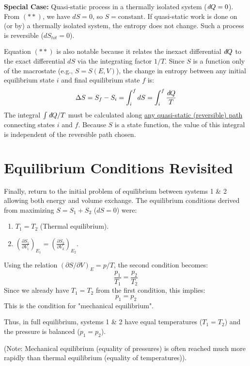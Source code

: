 \documentclass[11pt]{article}
\newcommand{\pderiv}[2]{\frac{\partial #1}{\partial #2}}
\newcommand{\ethbar}{\text{\it{đ}}} %
\begin{document}
\textbf{Special Case:} Quasi-static process in a thermally isolated system ($\ethbar Q = 0$).
From $(**)$, we have $dS = 0$, so $S = \text{constant}$.
If quasi-static work is done on (or by) a thermally isolated system, the entropy does not change. Such a process is reversible ($dS_{tot}=0$).

Equation $(**)$ is also notable because it relates the inexact differential $\ethbar Q$ to the exact differential $dS$ via the integrating factor $1/T$.
Since $S$ is a function only of the macrostate (e.g., $S=S(E,V)$), the change in entropy between any initial equilibrium state $i$ and final equilibrium state $f$ is:
\[ \Delta S = S_f - S_i = \int_i^f dS = \int_i^f \frac{\ethbar Q}{T} \]
The integral $\int \ethbar Q / T$ must be calculated along \underline{any quasi-static (reversible) path} connecting states $i$ and $f$. Because $S$ is a state function, the value of this integral is independent of the reversible path chosen.

\begin{center}
\end{center}

\section*{Equilibrium Conditions Revisited}

Finally, return to the initial problem of equilibrium between systems 1 \& 2 allowing both energy and volume exchange.
The equilibrium conditions derived from maximizing $S=S_1+S_2$ ($dS=0$) were:
\begin{enumerate}
    \item $T_1 = T_2$ (Thermal equilibrium).
    \item $\left( \pderiv{S_1}{V_1} \right)_{E_1} = \left( \pderiv{S_2}{V_2} \right)_{E_2}$.
\end{enumerate}
Using the relation $(\partial S / \partial V)_E = p/T$, the second condition becomes:
\[ \frac{p_1}{T_1} = \frac{p_2}{T_2} \]
Since we already have $T_1 = T_2$ from the first condition, this implies:
\[ p_1 = p_2 \]
This is the condition for "mechanical equilibrium".

Thus, in full equilibrium, systems 1 \& 2 have equal temperatures ($T_1=T_2$) and the pressure is balanced ($p_1=p_2$).

(Note: Mechanical equilibrium (equality of pressures) is often reached much more rapidly than thermal equilibrium (equality of temperatures)).
\end{document}
